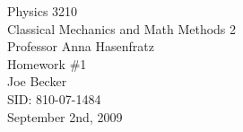 \begin{titlepage}
\begin{center}

\Huge{Physics 3210} \\
\LARGE{Classical Mechanics and Math Methods 2} \\
\Large{Professor Anna Hasenfratz} \\[1cm]

\huge{Homework \#1}\\[0.5cm]

\large{Joe Becker} \\
\large{SID: 810-07-1484} \\
\large{September 2nd, 2009} 

\end{center}

\end{titlepage}

